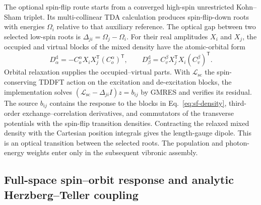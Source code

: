 The optional spin-flip route starts from a converged high-spin
unrestricted Kohn--Sham triplet. Its multi-collinear TDA calculation
produces spin-flip-down roots with energies $\Omega_i$ relative to that
auxiliary reference.\cite{gpu} The optical gap between two selected
low-spin roots is $\Delta_{ji}=\Omega_j-\Omega_i$. For their real amplitudes
$X_i$ and $X_j$, the occupied and virtual blocks of the mixed density
have the atomic-orbital form
\begin{equation}
 D_{\alpha}^{\mathrm d}=-C_o^\alpha X_i X_j^{\mathsf T}(C_o^\alpha)^{\mathsf T},
 \qquad
 D_{\beta}^{\mathrm d}=C_v^\beta X_j^{\mathsf T}X_i(C_v^\beta)^{\mathsf T}.
 \label{eq:sf-density}
\end{equation}
Orbital relaxation supplies the occupied--virtual parts. With
$\mathcal L_{\mathrm{sc}}$ the spin-conserving TDDFT action on the
excitation and de-excitation blocks, the implementation solves
$(\mathcal L_{\mathrm{sc}}-\Delta_{ji} I)z=b_{ij}$ by GMRES and verifies
its residual. The source $b_{ij}$ contains the response to the blocks in
Eq.~\eqref{eq:sf-density}, third-order exchange--correlation derivatives,
and commutators of the transverse potentials with the spin-flip transition
densities. Contracting the relaxed mixed density with the Cartesian
position integrals gives the length-gauge dipole. This is an optical
transition between the selected roots. The population and photon-energy
weights enter only in the subsequent vibronic assembly.

\subsection{Full-space spin--orbit response and analytic Herzberg--Teller coupling}
\label{sec:electronic-phosphorescence}

